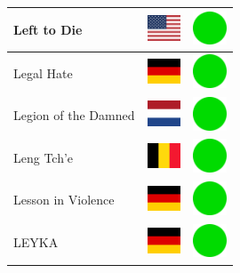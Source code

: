 \documentclass[12pt, a4paper, twoside]{report}
\begin{document}
\begin{center}
\begin{longtable}{|p{5cm}|p{2cm}|p{2cm}|}
 Left to Die                                                & \includegraphics[width=1cm]{../img/flags/us} &   \includegraphics[width=1cm]{../likes/y} \\ \hline
 Legal Hate                                                 & \includegraphics[width=1cm]{../img/flags/de} &   \includegraphics[width=1cm]{../likes/y} \\ \hline
 Legion of the Damned                                       & \includegraphics[width=1cm]{../img/flags/nl} &   \includegraphics[width=1cm]{../likes/y} \\ \hline
 Leng Tch'e                                                 & \includegraphics[width=1cm]{../img/flags/be} &   \includegraphics[width=1cm]{../likes/y} \\ \hline
 Lesson in Violence                                         & \includegraphics[width=1cm]{../img/flags/de} &   \includegraphics[width=1cm]{../likes/y} \\ \hline
 LEYKA                                                      & \includegraphics[width=1cm]{../img/flags/de} &   \includegraphics[width=1cm]{../likes/y} \\ \hline

\end{longtable}
\end{center}
\end{document}
